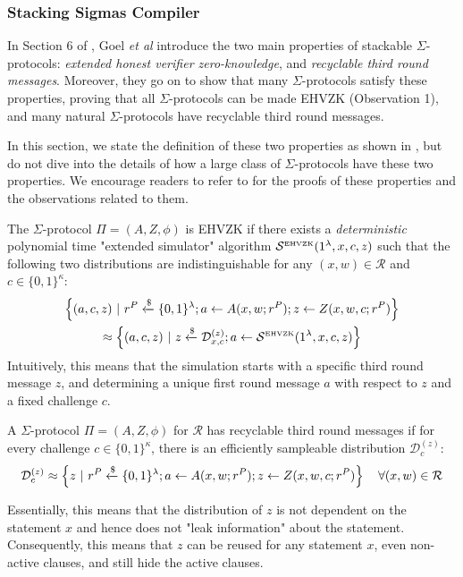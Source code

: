 \subsubsection{Stacking Sigmas Compiler}
In Section 6 of \cite{StackingSigmas}, Goel \emph{et al} introduce the two main properties of stackable $\Sigma$-protocols: \textit{extended honest verifier 
zero-knowledge}, and \textit{recyclable third round messages}. Moreover, they go on to show that many $\Sigma$-protocols satisfy these properties, 
proving that all $\Sigma$-protocols can be made EHVZK (Observation 1), and many natural $\Sigma$-protocols have recyclable third round messages. 

In this section, we state the definition of these two properties as shown in \cite{StackingSigmas}, but do not dive into the details of how a large class of 
$\Sigma$-protocols have these two properties. We encourage readers to refer to \cite{StackingSigmas} for the proofs of these properties and the observations 
related to them.

\begin{definition}
  The $\Sigma$-protocol $\Pi = (A, Z, \phi)$ is EHVZK if there exists a \textit{deterministic} polynomial time "extended simulator" algorithm 
  $\mathcal S^{\text{\tiny EHVZK}}(1^\lambda, x, c, z)$ such that the following two distributions are indistinguishable for any $(x,w) \in \mathcal R$ 
  and $c \in \{0,1\}^\kappa$:
  \begin{multline*}
    \left\{
      (a,c,z) \ \vert\  r^P \xleftarrow{\$} \{0,1\}^\lambda; a \leftarrow A(x, w; r^P); z \leftarrow Z(x,w,c; r^P)
    \right\} \\
    \approx
    \left\{
      (a,c,z) \ \vert\  z \xleftarrow{\$} \mathcal D_{x,c}^{(z)}; a \leftarrow \mathcal S^{\text{\tiny EHVZK}}(1^\lambda, x, c, z)
    \right\}
  \end{multline*}
  Intuitively, this means that the simulation starts with a specific third round message $z$, and determining a unique first round message $a$ with respect to 
  $z$ and a fixed challenge $c$.
\end{definition}

\begin{definition}
  A $\Sigma$-protocol $\Pi = (A, Z, \phi)$ for $\mathcal R$ has recyclable third round messages if for every challenge $c \in \{0,1\}^\kappa$, there is an 
  efficiently sampleable distribution $\mathcal D_c^{(z)}$:
  $$
    \mathcal D_c^{(z)} \approx \left\{z \ \vert\  r^P \xleftarrow{\$} \{0,1\}^\lambda; a \leftarrow A(x,w;r^P); z \leftarrow Z(x,w,c;r^P) \right\}\quad 
    \forall (x,w) \in \mathcal R 
  $$
\end{definition}
  Essentially, this means that the distribution of $z$ is not dependent on the statement $x$ and hence does not "leak information" about the statement. 
  Consequently, this means that $z$ can be reused for any statement $x$, even non-active clauses, and still hide the active clauses. 

